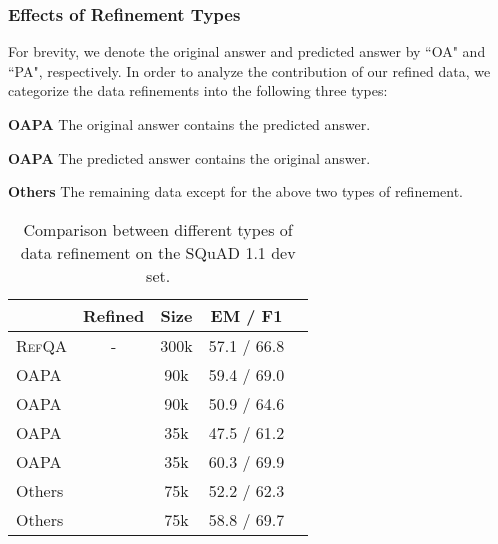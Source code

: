\documentclass[11pt,a4paper]{article}
\newcommand\refqa{\textsc{RefQA}}
\newcommand{\cmark}{\ding{51}}\newcommand{\xmark}{\ding{55}}
\begin{document}
\begin{comment}
\subsubsection{Effects of Iterative Training}
Table~\ref{tab:merge} shows that combining the refined data with filtered data, iterative training achieves the best performance with 72.6 F1 on the SQuAD 1.1 dev set. As shown in Figure~\ref{fig:multiround}, we also investigate the performance of iterative training with respect to the number of iterations.



\begin{figure}[t]
    \centering
    \texttt{[image: images/multiround.pdf]}
    \caption{Performance on each iteration for the settings of using only refined data and combining with filtered data on the SQuAD 1.1 dev set.}
    \label{fig:multiround}
\end{figure}
\end{comment}

\subsubsection{Effects of Refinement Types}
\label{sec:eda}

For brevity, we denote the original answer and predicted answer by ``OA" and ``PA", respectively.
In order to analyze the contribution of our refined data, we categorize the data refinements into the following three types:


\noindent
\textbf{OAPA} The original answer contains the predicted answer.

\noindent
\textbf{OAPA} The predicted answer contains the original answer.

\noindent
\textbf{Others} The remaining data except for the above two types of refinement.


\begin{table}[t]
\centering
\begin{tabular}{lcccc}
\toprule
  & Refined & Size  & EM / F1   \\ \midrule
\refqa{} & - & 300k & 57.1 / 66.8 \\ \midrule
OAPA & \xmark & 90k & 59.4 / 69.0 \\
OAPA & \cmark & 90k & 50.9 / 64.6 \\
OAPA & \xmark & 35k & 47.5 / 61.2 \\
OAPA & \cmark & 35k & 60.3 / 69.9 \\
Others & \xmark& 75k & 52.2 / 62.3 \\
Others & \cmark& 75k & 58.8 / 69.7 \\
\bottomrule
\end{tabular}
\caption{Comparison between different types of data refinement on the SQuAD 1.1 dev set.}
\label{tab:case}
\end{table}
\end{document}
